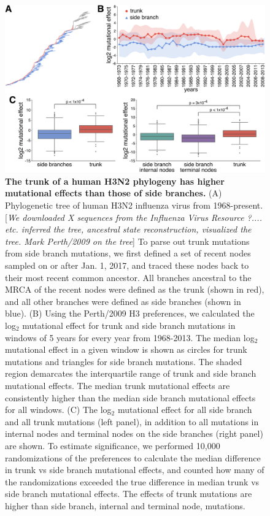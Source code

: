 \documentclass[11pt]{article}
\newcommand{\comment}[1]{{\color{red}[\textsl{#1}]}}
\begin{document}
\begin{figure}
\centerline{\includegraphics[width=\textwidth]{figs/trunkvssidebranch/trunkvssidebranch.pdf}}
\caption{\label{fig:trunkvssidebranch}
{\bf The trunk of a human H3N2 phylogeny has higher mutational effects than those of side branches.}
(A) Phylogenetic tree of human H3N2 influenza virus from 1968-present. 
\comment{We downloaded X sequences from the Influenza Virus Resource ?.... etc. inferred the tree, ancestral state reconstruction, visualized the tree. Mark Perth/2009 on the tree}
To parse out trunk mutations from side branch mutations, we first defined a set of recent nodes sampled on or after Jan. 1, 2017, and traced these nodes back to their most recent common ancestor. 
All branches ancestral to the MRCA of the recent nodes were defined as the trunk (shown in red), and all other branches were defined as side branches (shown in blue).
(B) Using the Perth/2009 H3 preferences, we calculated the log$_{2}$ mutational effect for trunk and side branch mutations in windows of 5 years for every year from 1968-2013. 
The median log$_{2}$ mutational effect in a given window is shown as circles for trunk mutations and triangles for side branch mutations. 
The shaded region demarcates the interquartile range of trunk and side branch mutational effects.
The median trunk mutational effects are consistently higher than the median side branch mutational effects for all windows.
(C) The log$_{2}$ mutational effect for all side branch and all trunk mutations (left panel), in addition to all mutations in internal nodes and terminal nodes on the side branches (right panel) are shown.
To estimate significance, we performed 10,000 randomizations of the preferences to calculate the median difference in trunk vs side branch mutational effects, and counted how many of the randomizations exceeded the true difference in median trunk vs side branch mutational effects.
The effects of trunk mutations are higher than side branch, internal and terminal node, mutations.
}
\end{figure}
\end{document}
